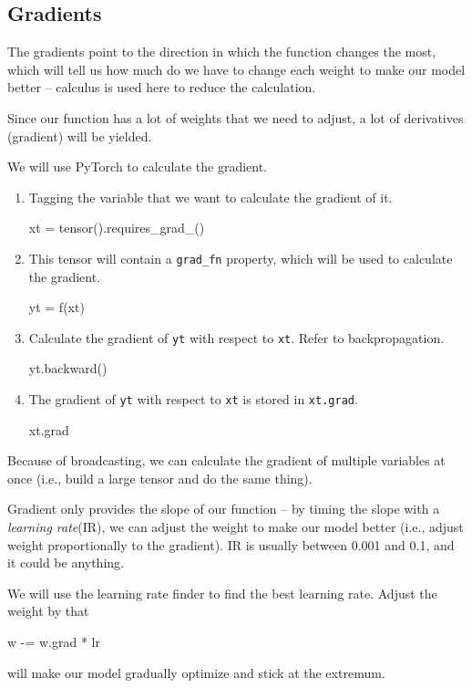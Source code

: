 \documentclass{article}
\newenvironment{monos}{\VerbatimEnvironment\begin{pythoncode}}{\end{pythoncode}}
\begin{document}
\subsection{Gradients}

The gradients point to the direction in which the function changes the most, which will tell us
how much do we have to change each weight to make our model better -- calculus is used
here to reduce the calculation.

Since our function has a lot of weights that we need to adjust, a lot of derivatives
(gradient) will be yielded.

We will use PyTorch to calculate the gradient.

\begin{enumerate}
    \item Tagging the variable that we want to calculate the gradient of it.
          \begin{monos}
              xt = tensor().requires_grad_()
          \end{monos}
    \item This tensor will contain a \verb!grad_fn! property, which will be used to calculate the gradient.
          \begin{monos}
              yt = f(xt)
          \end{monos}
    \item Calculate the gradient of \verb!yt! with respect to \verb!xt!. Refer to backpropagation.
          \begin{monos}
              yt.backward()
          \end{monos}
    \item The gradient of \verb!yt! with respect to \verb!xt! is stored in \verb!xt.grad!.
          \begin{monos}
              xt.grad
          \end{monos}
\end{enumerate}

Because of broadcasting, we can calculate the gradient of multiple variables at once
(i.e., build a large tensor and do the same thing).

Gradient only provides the slope of our function -- by timing the slope with a
\textit{learning rate}(IR), we can adjust the weight to make our model better (i.e.,
adjust weight proportionally to the gradient). IR is usually between 0.001 and 0.1, and
it could be anything.

We will use the learning rate finder to find the best learning rate. Adjust the weight by that
\begin{monos}
    w -= w.grad * lr
\end{monos}
will make our model gradually optimize and stick at the extremum.
\end{document}
